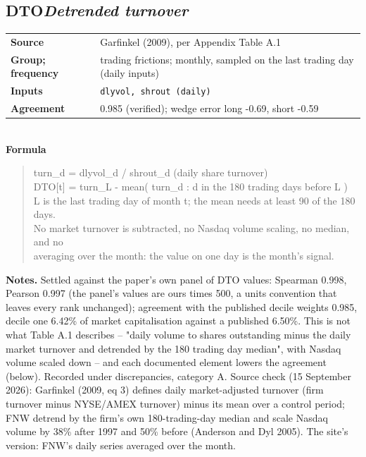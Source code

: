 \documentclass[11pt]{article}
\begin{document}
\subsection*{DTO\quad\normalfont\itshape Detrended turnover}
\begin{tabular}{@{}p{3.3cm}p{12.3cm}@{}}
\textbf{Source} & Garfinkel (2009), per Appendix Table A.1\\
\textbf{Group; frequency} & trading frictions; monthly, sampled on the last trading day (daily inputs)\\
\textbf{Inputs} & \texttt{dlyvol, shrout (daily)}\\
\textbf{Agreement} & 0.985 (verified); wedge error long -0.69, short -0.59\\
\end{tabular}\\[4pt]
\textbf{Formula}
\begin{quote}\small
turn\_d = dlyvol\_d / shrout\_d                          (daily share turnover)\\
DTO[t] = turn\_L - mean( turn\_d : d in the 180 trading days before L )\\
L is the last trading day of month t; the mean needs at least 90 of the 180 days.\\
No market turnover is subtracted, no Nasdaq volume scaling, no median, and no\\
averaging over the month: the value on one day is the month's signal.\\

\end{quote}
\textbf{Notes.} Settled against the paper's own panel of DTO values: Spearman 0.998, Pearson 0.997 (the panel's values are ours times 500, a units convention that leaves every rank unchanged); agreement with the published decile weights 0.985, decile one 6.42\% of market capitalisation against a published 6.50\%. This is not what Table A.1 describes -- "daily volume to shares outstanding minus the daily market turnover and detrended by the 180 trading day median", with Nasdaq volume scaled down -- and each documented element lowers the agreement (below). Recorded under discrepancies, category A. Source check (15 September 2026): Garfinkel (2009, eq 3) defines daily market-adjusted turnover (firm turnover minus NYSE/AMEX turnover) minus its mean over a control period; FNW detrend by the firm's own 180-trading-day median and scale Nasdaq volume by 38\% after 1997 and 50\% before (Anderson and Dyl 2005). The site's version: FNW's daily series averaged over the month.
\end{document}
